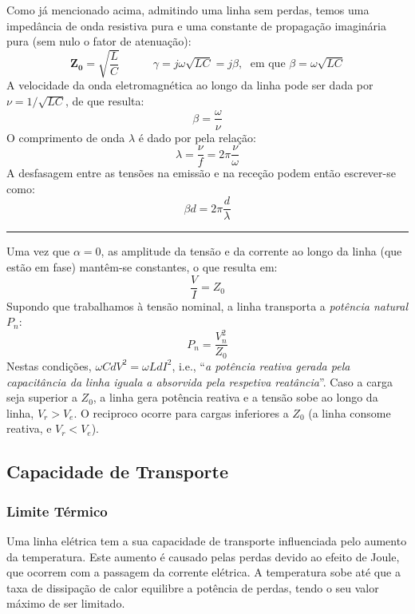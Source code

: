 Como já mencionado acima, admitindo uma linha sem perdas, temos uma impedância de onda resistiva pura e uma constante de propagação imaginária pura (sem nulo o fator de atenuação):
$$
    \mathbf{Z_0} = \sqrt{\dfrac{L}{C}}
    \qquad\quad
    \gamma = j\omega\sqrt{LC} = j\beta,\; \text{ em que $\beta = \omega \sqrt{LC}$}
$$
A velocidade da onda eletromagnética ao longo da linha pode ser dada por $\nu = 1/\sqrt{LC}$, de que resulta:
$$
    \beta = \frac{\omega}{\nu}
$$
O comprimento de onda $\lambda$ é dado por pela relação:
$$
    \lambda = \frac{\nu}{f} = 2\pi \frac{\nu}{\omega}
$$
A desfasagem entre as tensões na emissão e na receção podem então escrever-se como:
$$
    \beta d = 2\pi \frac{d}{\lambda}
$$

\vspace{0.25em}\hrule\vspace{0.5em}

\noindent Uma vez que $\alpha = 0$, as amplitude da tensão e da corrente ao longo da linha (que estão em fase) mantêm-se constantes, o que resulta em:
$$
    \frac{V}{I} = Z_0
$$
Supondo que trabalhamos à tensão nominal, a linha transporta a \textit{potência natural} $P_n$:
$$
    P_n = \frac{V^2_n}{Z_0}
$$
Nestas condições, $\omega C d V^2 = \omega L d I^2$, i.e., ``\textit{a potência reativa gerada pela capacitância da linha iguala a absorvida pela respetiva reatância}''\cite{paiva2005}. Caso a carga seja superior a $Z_0$, a linha gera potência reativa e a tensão sobe ao longo da linha, $V_r > V_e$. O reciproco ocorre para cargas inferiores a $Z_0$ (a linha consome reativa, e $V_r < V_e$).
\newpage
\subsection{Capacidade de Transporte}

\subsubsection{Limite Térmico}

 Uma linha elétrica tem a sua capacidade de transporte influenciada pelo aumento da temperatura. Este aumento é causado pelas perdas devido ao efeito de Joule, que ocorrem com a passagem da corrente elétrica. A temperatura sobe até que a taxa de dissipação de calor equilibre a potência de perdas, tendo o seu valor máximo de ser limitado.
 

